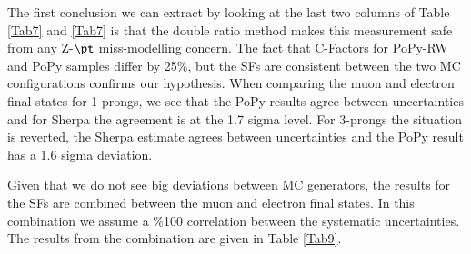 The first conclusion we can extract by looking at the last two columns of Table \ref{Tab7} and \ref{Tab7} is that the double ratio method makes this measurement safe from any Z-$\pt$ miss-modelling concern. The fact that C-Factors for PoPy-RW and PoPy samples differ by 25$\%$, but the SFs are consistent between the two MC configurations confirms our hypothesis. When comparing the muon and electron final states for 1-prongs, we see that the PoPy results agree between uncertainties and for Sherpa the agreement is at the 1.7 sigma level. For 3-prongs the situation is reverted, the Sherpa estimate agrees between uncertainties and the PoPy result has a 1.6 sigma deviation.

Given that we do not see big deviations between MC generators, the results for the SFs are combined between the muon and electron final states. In this combination we assume a $\%$100 correlation between the systematic uncertainties. The results from the combination are given in Table \ref{Tab9}.
\begin{table}[]
\end{table} 

